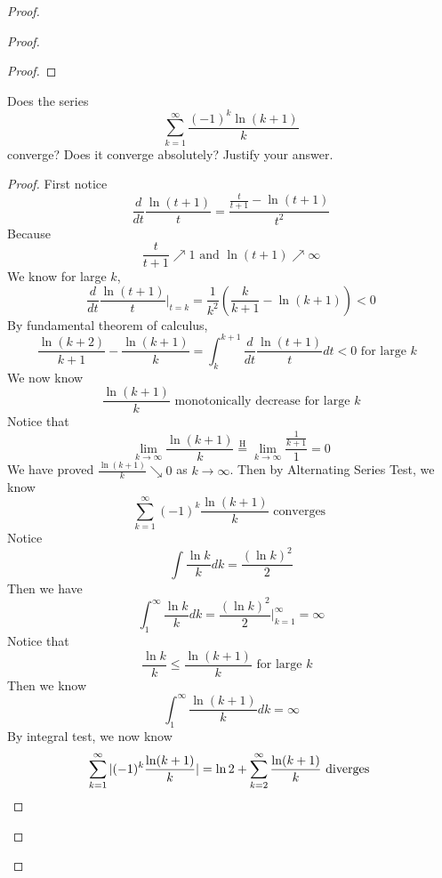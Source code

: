 \documentclass{report}
\begin{document}
\begin{proof}
\begin{proof}
\begin{proof}
\end{proof}

\begin{question}{}{}
Does the series
\[
\sum_{k=1}^{\infty} \frac{(-1)^k \ln(k + 1)}{k}
\]
converge? Does it converge absolutely? Justify your answer.
\end{question}
\begin{proof}
First notice
\begin{equation}
\frac{d}{dt}\frac{\ln (t+1)}{t} =\frac{\frac{t}{t+1}- \ln (t+1)}{t^2}
\end{equation}
Because 
\begin{equation}
\frac{t}{t+1}\nearrow 1 \text{ and }\ln (t+1)\nearrow \infty
\end{equation}
We know for large $k$, 
\begin{equation}
\frac{d}{dt}\frac{\ln (t+1)}{t} \bigg|_{t=k} =\frac{1}{k^2}(\frac{k}{k+1}-\ln (k+1))<0
\end{equation}
By fundamental theorem of calculus, 
\begin{equation}
\frac{\ln (k+2)}{k+1}-\frac{\ln (k+1)}{k}=\int_{k}^{k+1} \frac{d}{dt} \frac{\ln (t+1)}{t}dt<0\text{ for large $k$ }
\end{equation}
We now know 
\begin{equation}
\frac{\ln (k+1)}{k}\text{ monotonically decrease for large $k$}
\end{equation}
Notice that 
\begin{equation}
\lim_{k\to\infty} \frac{\ln (k+1)}{k}\stackrel{\mathrm{H}}{=}\lim_{k\to\infty} \frac{\frac{1}{k+1}}{1}=0
\end{equation}
We have proved $\frac{\ln (k+1)}{k}\searrow 0$ as $k\to\infty$. Then by Alternating Series Test, we know 
\begin{equation}
\sum_{k=1}^\infty (-1)^k \frac{\ln (k+1)}{k}\text{ converges }
\end{equation}
Notice 
\begin{equation}
\int \frac{\ln k}{k}dk=\frac{(\ln k)^2}{2}
\end{equation}
Then we have
\begin{equation}
\int_{1}^\infty \frac{\ln k}{k}dk= \frac{(\ln k)^2}{2}\bigg|_{k=1}^\infty =\infty 
\end{equation}
Notice that 
\begin{equation}
\frac{\ln k}{k}\leq \frac{\ln (k+1)}{k}\text{ for large $k$ }
\end{equation}
Then we know
\begin{equation}
\int_1^\infty \frac{\ln (k+1)}{k}dk =\infty
\end{equation}
By integral test, we now know 
\begin{equation}
\sum_{k=1}^\infty |(-1)^k \frac{\ln (k+1)}{k}|=\ln 2+\sum_{k=2}^\infty \frac{\ln (k+1)}{k}\text{ diverges }
\end{equation}



\end{proof}
\end{proof}
\end{proof}
\end{document}
